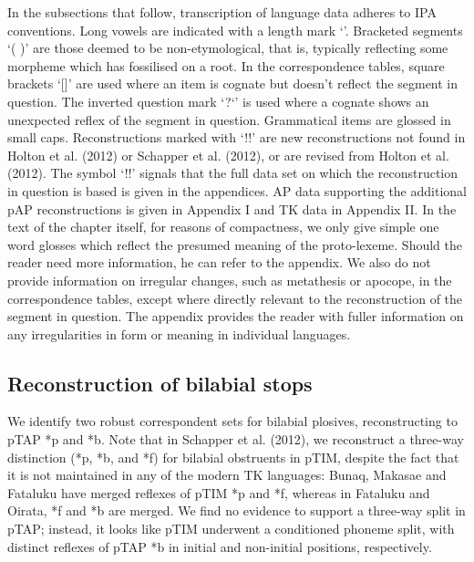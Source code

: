 \documentclass[a4paper]{article}
\begin{document}
In the subsections that follow, transcription of language data adheres to IPA conventions. Long vowels are indicated with a length mark {\textquoteleft}{\textlengthmark}{\textquoteright}. Bracketed segments {\textquoteleft}( ){\textquoteright} are those deemed to be non-etymological, that is, typically reflecting some morpheme which has fossilised on a root. In the correspondence tables, square brackets {\textquoteleft}[]{\textquoteright} are used where an item is cognate but doesn{\textquoteright}t reflect the segment in question. The inverted question mark {\textquoteleft}?`{\textquoteright} is used where a cognate shows an unexpected reflex of the segment in question. Grammatical items are glossed in small caps. Reconstructions marked with {\textquoteleft}!!{\textquoteright} are new reconstructions not found in Holton et al. (2012) or Schapper et al. (2012), or are revised from Holton et al. (2012). The symbol {\textquoteleft}!!{\textquoteright} signals that the full data set on which the reconstruction in question is based is given in the appendices. AP data supporting the additional pAP reconstructions is given in Appendix I and TK data in Appendix II. In the text of the chapter itself, for reasons of compactness, we only give simple one word glosses which reflect the presumed meaning of the proto-lexeme. Should the reader need more information, he can refer to the appendix. We also do not provide information on irregular changes, such as metathesis or apocope, in the correspondence tables, except where directly relevant to the reconstruction of the segment in question. The appendix provides the reader with fuller information on any irregularities in form or meaning in individual languages. 

\subsection[Reconstruction of bilabial stops]{\textbf{Reconstruction of bilabial stops}}
We identify two robust correspondent sets for bilabial plosives, reconstructing to pTAP *p and *b. Note that in Schapper et al. (2012), we reconstruct a three-way distinction (*p, *b, and *f) for bilabial obstruents in pTIM, despite the fact that it is not maintained in any of the modern TK languages: Bunaq, Makasae and Fataluku have merged reflexes of pTIM *p and *f, whereas in Fataluku and Oirata, *f and *b are merged. We find no evidence to support a three-way split in pTAP; instead, it looks like pTIM underwent a conditioned phoneme split, with distinct reflexes of pTAP *b in initial and non-initial positions, respectively. 
\end{document}
